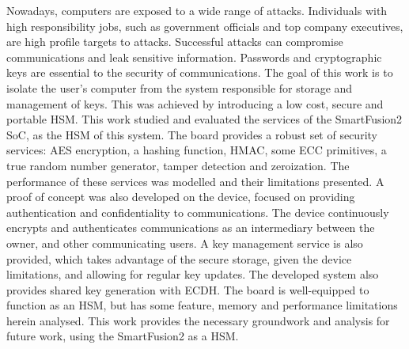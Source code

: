 \noindent Nowadays, computers are exposed to a wide range of attacks. Individuals with high responsibility jobs, such as government officials and top company executives, are high profile targets to attacks. Successful attacks can compromise communications and leak sensitive information. Passwords and cryptographic keys are essential to the security of communications. The goal of this work is to isolate the user's computer from the system responsible for storage and management of keys. This was achieved by introducing a low cost, secure and portable \ac{HSM}. This work studied and evaluated the services of the SmartFusion2 \ac{SoC}, as the HSM of this system. The board provides a robust set of security services: AES encryption, a hashing function, HMAC, some ECC primitives, a true random number generator, tamper detection and zeroization. The performance of these services was modelled and their limitations presented. A proof of concept was also developed on the device, focused on providing authentication and confidentiality to communications. The device continuously encrypts and authenticates communications as an intermediary between the owner, and other communicating users. A key management service is also provided, which takes advantage of the secure storage, given the device limitations, and allowing for regular key updates. The developed system also provides shared key generation with ECDH. The board is well-equipped to function as an HSM, but has some feature, memory and performance limitations herein analysed. This work provides the necessary groundwork and analysis for future work, using the SmartFusion2 as a HSM.
